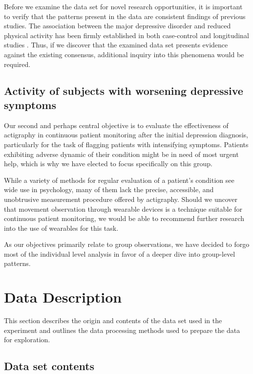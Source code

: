 \documentclass[12pt]{article}
\begin{document}
Before we examine the data set for novel research opportunities, it is important to verify that the patterns present in the data are consistent findings of previous studies. The association between the major depressive disorder and reduced physical activity has been firmly established in both case-control and longitudinal studies \parencite{Burton_2013}. Thus, if we discover that the examined data set presents evidence against the existing consensus, additional inquiry into this phenomena would be required.

\subsection{Activity of subjects with worsening depressive symptoms}

Our second and perhaps central objective is to evaluate the effectiveness of actigraphy in continuous patient monitoring after the initial depression diagnosis, particularly for the task of flagging patients with intensifying symptoms. Patients exhibiting adverse dynamic of their condition might be in need of most urgent help, which is why we have elected to focus specifically on this group.

While a variety of methods for regular evaluation of a patient's condition see wide use in psychology, many of them lack the precise, accessible, and unobtrusive measurement procedure offered by actigraphy. Should we uncover that movement observation through wearable devices is a technique suitable for continuous patient monitoring, we would be able to recommend further research into the use of wearables for this task.

As our objectives primarily relate to group observations, we have decided to forgo most of the individual level analysis in favor of a deeper dive into group-level patterns.

\section{Data Description}

This section describes the origin and contents of the data set used in the experiment and outlines the data processing methods used to prepare the data for exploration.

\subsection{Data set contents}
\end{document}
